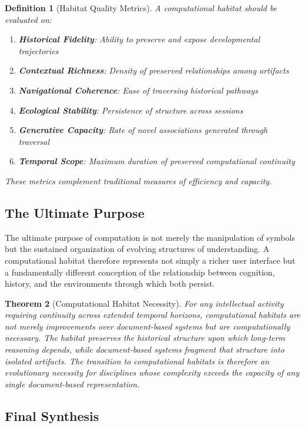 \documentclass[12pt,oneside]{article}
\newtheorem{definition}{Definition}[section]
\newtheorem{theorem}[definition]{Theorem}
\theoremstyle{remark}
\begin{document}
\begin{definition}[Habitat Quality Metrics]
A computational habitat should be evaluated on:
\begin{enumerate}
\item \textbf{Historical Fidelity}: Ability to preserve and expose developmental trajectories
\item \textbf{Contextual Richness}: Density of preserved relationships among artifacts
\item \textbf{Navigational Coherence}: Ease of traversing historical pathways
\item \textbf{Ecological Stability}: Persistence of structure across sessions
\item \textbf{Generative Capacity}: Rate of novel associations generated through traversal
\item \textbf{Temporal Scope}: Maximum duration of preserved computational continuity
\end{enumerate}
These metrics complement traditional measures of efficiency and capacity.
\end{definition}

\subsection{The Ultimate Purpose}

The ultimate purpose of computation is not merely the manipulation of symbols but the sustained organization of evolving structures of understanding. A computational habitat therefore represents not simply a richer user interface but a fundamentally different conception of the relationship between cognition, history, and the environments through which both persist.

\begin{theorem}[Computational Habitat Necessity]
For any intellectual activity requiring continuity across extended temporal horizons, computational habitats are not merely improvements over document-based systems but are computationally necessary. The habitat preserves the historical structure upon which long-term reasoning depends, while document-based systems fragment that structure into isolated artifacts. The transition to computational habitats is therefore an evolutionary necessity for disciplines whose complexity exceeds the capacity of any single document-based representation.
\end{theorem}

\subsection{Final Synthesis}
\end{document}
